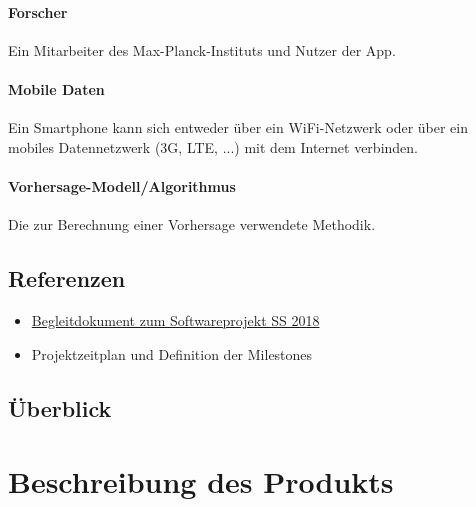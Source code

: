 \documentclass[12pt]{article} %
\begin{document}
 \paragraph{Forscher} Ein Mitarbeiter des Max-Planck-Instituts und Nutzer der App.
 \paragraph{Mobile Daten} Ein Smartphone kann sich entweder über ein WiFi-Netzwerk oder über ein mobiles Datennetzwerk (3G, LTE, ...) mit dem Internet verbinden. 
\paragraph{Vorhersage-Modell/Algorithmus} Die zur Berechnung einer Vorhersage verwendete Methodik. 

\subsection{Referenzen}

\begin{itemize} 
 	 \item  \href{https://docs.google.com/document/d/1Yc2f18JFaHyhrgM2h2WiATQ0zVmZnsc9W1ImhwWJF-g/edit?usp=sharing}{Begleitdokument zum Softwareprojekt SS 2018}
 	 \item Projektzeitplan und Definition der Milestones
\end{itemize} 



\subsection{Überblick}



\section{Beschreibung des Produkts}
\end{document}

